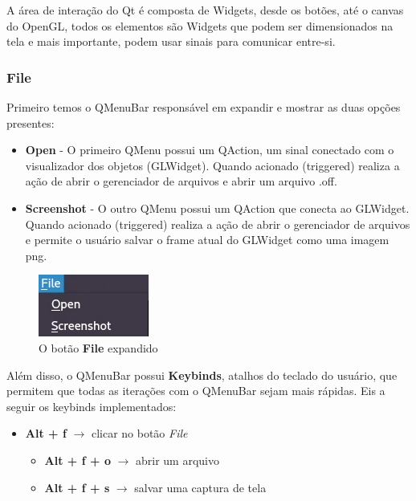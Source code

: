 \documentclass{ol-softwaremanual}
\begin{document}
A área de interação do Qt é composta de Widgets, desde os botões, até o canvas 
do OpenGL, todos os elementos são Widgets que podem ser dimensionados na tela e 
mais importante, podem usar sinais para comunicar entre-si.

\subsubsection{File}

Primeiro temos o QMenuBar responsável em expandir e mostrar as duas
opções presentes:

\begin{itemize}
    \item \textbf{Open} - O primeiro QMenu possui um QAction, um sinal conectado
    com o visualizador dos objetos (GLWidget). Quando acionado (triggered) realiza
    a ação de abrir o gerenciador de arquivos e abrir um arquivo .off.
    \item \textbf{Screenshot} - O outro QMenu possui um QAction que conecta 
    ao GLWidget. Quando acionado (triggered) realiza a ação de abrir o gerenciador de arquivos
    e permite o usuário salvar o frame atual do GLWidget como uma imagem png.
\end{itemize}

\begin{figure}[H]
    \centering
    \includegraphics[width=.2\textwidth]{File.jpg}
    \caption{O botão \textbf{File} expandido}
\end{figure}

Além disso, o QMenuBar possui \textbf{Keybinds}, atalhos do teclado do usuário, 
que permitem que todas as iterações com o QMenuBar sejam mais rápidas. Eis a seguir 
os keybinds implementados:

\begin{itemize}
    \item \textbf{Alt + f} $\rightarrow$ clicar no botão \emph{File}
    \begin{itemize}
        \item \textbf{Alt + f + o} $\rightarrow$ abrir um arquivo 
        \item \textbf{Alt + f + s} $\rightarrow$ salvar uma captura de tela 
    \end{itemize}
\end{itemize}
\end{document}
